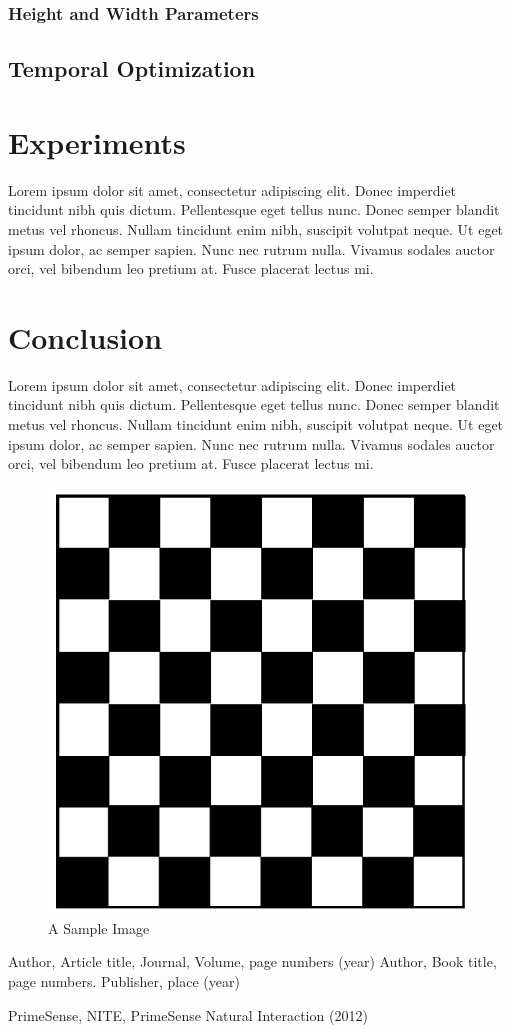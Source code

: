 \documentclass[twocolumn]{svjour3}          %
\begin{document}
\subsubsection{Height and Width Parameters}

\subsection{Temporal Optimization}
\label{subsec:3.3}

\section{Experiments}
\label{sec:4}
Lorem ipsum dolor sit amet, consectetur adipiscing elit. Donec imperdiet tincidunt nibh quis dictum. Pellentesque eget tellus nunc. Donec semper blandit metus vel rhoncus. Nullam tincidunt enim nibh, suscipit volutpat neque. Ut eget ipsum dolor, ac semper sapien. Nunc nec rutrum nulla. Vivamus sodales auctor orci, vel bibendum leo pretium at. Fusce placerat lectus mi.


\section{Conclusion}
\label{sec:5}
Lorem ipsum dolor sit amet, consectetur adipiscing elit. Donec imperdiet tincidunt nibh quis dictum. Pellentesque eget tellus nunc. Donec semper blandit metus vel rhoncus. Nullam tincidunt enim nibh, suscipit volutpat neque. Ut eget ipsum dolor, ac semper sapien. Nunc nec rutrum nulla. Vivamus sodales auctor orci, vel bibendum leo pretium at. Fusce placerat lectus mi.


\begin{figure}
	\begin{center}
			\includegraphics[width=0.9\columnwidth]{./bwgrid.jpg}
	\end{center}
	\caption{A Sample Image}
	\label{fig:1}
\end{figure}

\begin{thebibliography}{}
Author, Article title, Journal, Volume, page numbers (year)
Author, Book title, page numbers. Publisher, place (year)

PrimeSense, NITE,  PrimeSense Natural Interaction (2012)

\end{thebibliography}
\end{document}
